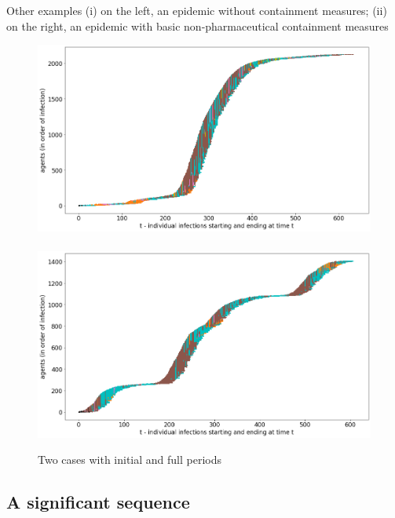 \documentclass[8pt]{beamer}
\begin{document}
\begin{frame}{Other examples (i) on the left, an epidemic without containment measures; (ii) on the right, an epidemic with basic non-pharmaceutical containment measures}
\begin{figure}[H]
\center
\includegraphics[scale=0.12]{no4a.png}~~~~~~~~~~~\includegraphics[scale=0.12]{with7a.png} \\
\caption{Two cases with initial and full periods} 
\label{twocases}
\end{figure}

\end{frame}

\subsection{A significant sequence}
\end{document}
